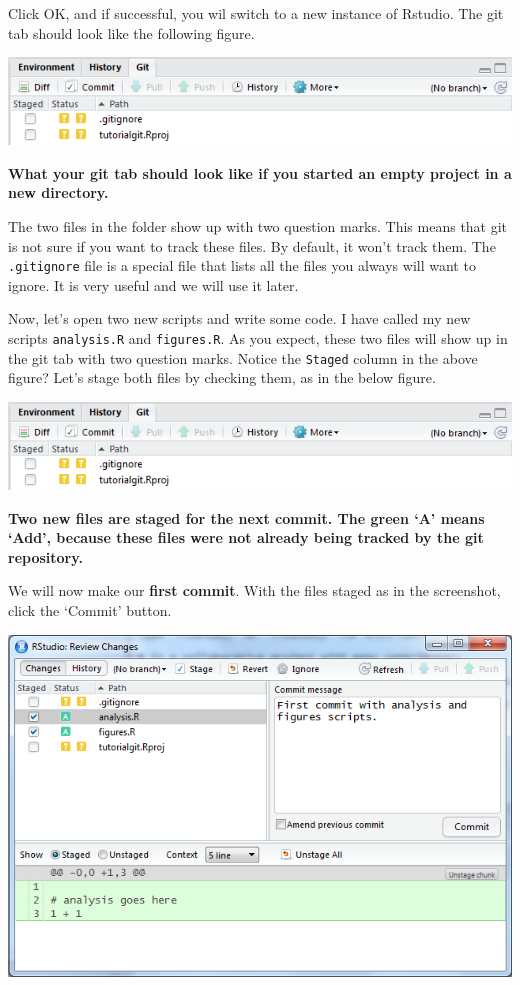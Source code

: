 \documentclass[]{book}
\begin{document}
Click OK, and if successful, you wil switch to a new instance of Rstudio. The git tab should look like the following figure.

\includegraphics[width=0.75\linewidth]{screenshots/gittabnewproject}

\textbf{What your git tab should look like if you started an empty project in a new directory.}

The two files in the folder show up with two question marks. This means that git is not sure if you want to track these files. By default, it won't track them. The \texttt{.gitignore} file is a special file that lists all the files you always will want to ignore. It is very useful and we will use it later.

Now, let's open two new scripts and write some code. I have called my new scripts \texttt{analysis.R} and \texttt{figures.R}. As you expect, these two files will show up in the git tab with two question marks. Notice the \texttt{Staged} column in the above figure? Let's stage both files by checking them, as in the below figure.

\includegraphics[width=0.75\linewidth]{screenshots/gittabnewproject}

\textbf{Two new files are staged for the next commit. The green `A' means `Add', because these files were not already being tracked by the git repository.}

We will now make our \textbf{first commit}. With the files staged as in the screenshot, click the `Commit' button.

\includegraphics[width=0.75\linewidth]{screenshots/gitfirstcommit}
\end{document}
